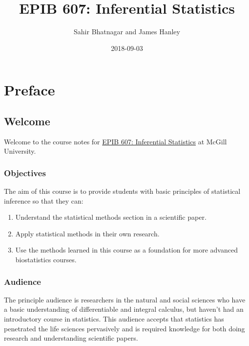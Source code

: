 \documentclass[]{book}
\title{EPIB 607: Inferential Statistics}
\author{Sahir Bhatnagar and James Hanley}
\date{2018-09-03}
\providecommand{\tightlist}{%
  \setlength{\itemsep}{0pt}\setlength{\parskip}{0pt}}
\providecommand{\tightlist}{%
  \setlength{\itemsep}{0pt}\setlength{\parskip}{0pt}}
\theoremstyle{definition}
\theoremstyle{definition}
\theoremstyle{definition}
\theoremstyle{remark}
\begin{document}
\maketitle

{
\setcounter{tocdepth}{1}
\tableofcontents
}
\part{Preface}\label{part-preface}

\chapter*{Welcome}\label{welcome}

Welcome to the course notes for
\href{https://www.mcgill.ca/study/2018-2019/courses/epib-607}{EPIB 607:
Inferential Statistics} at McGill University.

\section*{Objectives}\label{objectives}

The aim of this course is to provide students with basic principles of
statistical inference so that they can:

\begin{enumerate}
\def\labelenumi{\arabic{enumi}.}
\tightlist
\item
  Understand the statistical methods section in a scientific paper.\\
\item
  Apply statistical methods in their own research.\\
\item
  Use the methods learned in this course as a foundation for more
  advanced biostatistics courses.
\end{enumerate}

\section*{Audience}\label{audience}

The principle audience is researchers in the natural and social sciences
who have a basic understanding of differentiable and integral calculus,
but haven't had an introductory course in statistics. This audience
accepts that statistics has penetrated the life sciences pervasively and
is required knowledge for both doing research and understanding
scientific papers.
\end{document}

